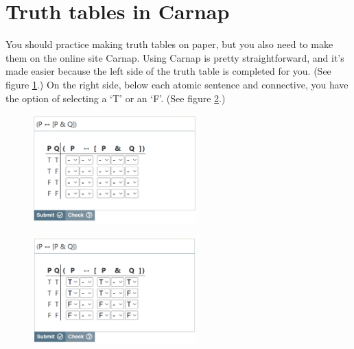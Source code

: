 
\section{Truth tables in Carnap}\label{s:ttCarnap-intro}

You should practice making truth tables on paper, but you also need to make them on the online site Carnap. Using Carnap is pretty straightforward, and it's made easier because the left side of the truth table is completed for you. (See figure \ref{fig:tt-1}.) On the right side, below each atomic sentence and connective, you have the option of selecting a `T' or an `F'. (See figure \ref{fig:tt-2}.)  


\begin{figure}[h]
\centering
\includegraphics[width=6.3cm]{tt-1.png}
\caption{}
\label{fig:tt-1}
\end{figure}

\begin{figure} [h]
\centering
\includegraphics[width=6.3cm]{tt-2.png}
\caption{}
\label{fig:tt-2}
\end{figure}

